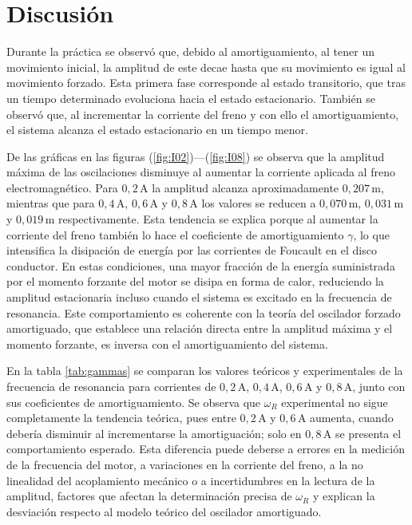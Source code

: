 \section*{Discusi\'on}

Durante la pr\'actica se observ\'o que, debido al amortiguamiento, al tener un 
movimiento inicial, la amplitud de este decae hasta que su movimiento es igual 
al movimiento forzado. Esta primera fase corresponde al estado transitorio, que 
tras un tiempo determinado evoluciona hacia el estado estacionario. Tambi\'en se 
observ\'o que, al incrementar la corriente del freno y con ello el 
amortiguamiento, el sistema alcanza el estado estacionario en un tiempo menor.

De las gr\'aficas en las figuras (\ref{fig:I02})---(\ref{fig:I08}) se observa que 
la amplitud m\'axima de las oscilaciones disminuye al aumentar la corriente 
aplicada al freno electromagn\'etico. Para \(0{,}2\,\text{A}\) la amplitud 
alcanza aproximadamente \(0{,}207\,\text{m}\), mientras que para 
\(0{,}4\,\text{A}\), \(0{,}6\,\text{A}\) y \(0{,}8\,\text{A}\) los valores se 
reducen a \(0{,}070\,\text{m}\), \(0{,}031\,\text{m}\) y \(0{,}019\,\text{m}\) 
respectivamente. Esta tendencia se explica porque al aumentar la corriente del 
freno tambi\'en lo hace el coeficiente de amortiguamiento \(\gamma\), lo que 
intensifica la disipaci\'on de energ\'ia por las corrientes de Foucault en el 
disco conductor. En estas condiciones, una mayor fracci\'on de la energ\'ia 
suministrada por el momento forzante del motor se disipa en forma de calor, 
reduciendo la amplitud estacionaria incluso cuando el sistema es excitado en la 
frecuencia de resonancia. Este comportamiento es coherente con la teor\'ia del 
oscilador forzado amortiguado, que establece una relaci\'on directa entre la 
amplitud m\'axima y el momento forzante, es inversa con el amortiguamiento del 
sistema.

En la tabla \ref{tab:gammas} se comparan los valores te\'oricos y experimentales de la 
frecuencia de resonancia para corrientes de \(0{,}2\,\text{A}\), 
\(0{,}4\,\text{A}\), \(0{,}6\,\text{A}\) y \(0{,}8\,\text{A}\), junto con sus 
coeficientes de amortiguamiento. Se observa que \(\omega_R\) experimental no 
sigue completamente la tendencia te\'orica, pues entre \(0{,}2\,\text{A}\) y 
\(0{,}6\,\text{A}\) aumenta, cuando deber\'ia disminuir al incrementarse la 
amortiguaci\'on; solo en \(0{,}8\,\text{A}\) se presenta el comportamiento 
esperado. Esta diferencia puede deberse a errores en la medici\'on de la 
frecuencia del motor, a variaciones en la corriente del freno, a la no 
linealidad del acoplamiento mec\'anico o a incertidumbres en la lectura de la 
amplitud, factores que afectan la determinaci\'on precisa de \(\omega_R\) y 
explican la desviaci\'on respecto al modelo te\'orico del oscilador amortiguado.


